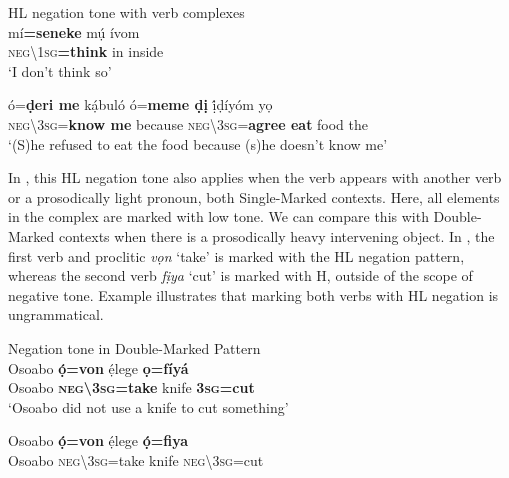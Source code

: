 \documentclass[output=paper]{langsci/langscibook}
\begin{document}
\ea\label{ex:rolle:hl}
{HL negation tone with verb complexes} \\
   \ea\label{ex:rolle:52}
\gll   mí\textbf{=seneke}      mụ́   ívom\\
     \textsc{neg{\textbackslash}1sg}\textbf{=think}    in   inside\\
\glt ‘I don’t think so’ \citep[32]{Kari2004}

\ex\label{ex:rolle:52b}
\gll   ó=\textbf{ḍeri       me}   k\'ạbuló   ó=\textbf{meme     ḍị}   ị́ḍíyóm   yọ\\
     \textsc{neg{\textbackslash}3sg}=\textbf{know  me}    because   \textsc{neg{\textbackslash}3sg}=\textbf{agree   eat}   food   the\\
\glt ‘(S)he refused to eat the food because (s)he doesn’t know me’ \citep[45]{Kari2004}  
\z
\z 

In , this HL negation tone also applies when the verb appears with another verb or a prosodically light pronoun, both Single-Marked contexts. Here, all elements in the complex are marked with low tone. We can compare this with Double-Marked contexts when there is a prosodically heavy intervening object. In , the first verb and proclitic \textit{vọn} ‘take’ is marked with the HL negation pattern, whereas the second verb \textit{fịya} ‘cut’ is marked with H, outside of the scope of negative tone. Example  illustrates that marking both verbs with HL negation is ungrammatical. 

\ea\label{ex:rolle:negdp}
{Negation tone in Double-Marked Pattern}\\
   \ea\label{ex:rolle:53}
\gll   Osoabo   \textbf{\'ọ=von}       ẹ́lege   \textbf{ọ=fíyá}\\
     Osoabo   \textbf{\textsc{neg{\textbackslash}3sg}=take}   knife   \textbf{3\textsc{sg}=cut}\\
\glt ‘Osoabo did not use a knife to cut something’ \citep[111]{Kari2004}

\ex\label{ex:rolle:54}
\gll   *Osoabo  \textbf{ọ́=von}       ẹ́lege   \textbf{ọ́=fiya}\\
     Osoabo   \textsc{neg{\textbackslash}3sg}=take   knife   \textsc{neg{\textbackslash}}3\textsc{sg}=cut\\
\z
\z 
\end{document}
